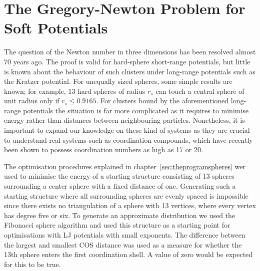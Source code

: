 \section{The Gregory-Newton Problem for Soft Potentials}
\label{sec:thegregorynewtonproblemforsoftpotentials}

The question of the Newton number in three dimensions has been resolved almost
70 years ago\autocite{Schutte_ProblemdreizehnKugeln_1952}. The proof is valid
for hard-sphere short-range potentials, but little is known about the behaviour
of such clusters under long-range potentials such as the Kratzer
potential\autocite{Kratzer_ultrarotenRotationsspektrenHalogenwasserstoffe_1920}.
For unequally sized spheres, some simple results are known; for example, 13 hard
spheres of radius $r_s$ can touch a central sphere of unit radius only if
$r_s\leq 0.9165$.\autocite{phillips12} For clusters bound by the aforementioned
long-range potentials the situation is far more complicated as it requires to
minimise energy rather than distances between neighbouring particles.
Nonetheless, it is important to expand our knowledge on these kind of systems as
they are crucial to understand real systems such as coordination compounds,
which have recently been shown to possess coordination numbers as high as
17\autocite{Kaltsoyannis-2017} or 20.\autocite{Suresh-2016} 

The optimisation procedures explained in chapter~\ref{sec:theprogramspheres} wer
used to minimise the energy of a starting structure consisting of 13 spheres
surrounding a center sphere with a fixed distance of one. Generating such a
starting structure where all surrounding spheres are evenly spaced is impossible
since there exists no triangulation of a sphere with 13 vertices, where every
vertex has degree five or six\autocite{Schwerdtfeger_topologyfullerenes_2015}.
To generate an approximate distribution we used the Fibonacci sphere
algorithm\autocite{Gonzalez_MeasurementAreasSphere_2010,Keinert_SphericalFibonacciMapping_2015}
and used this structure as a starting point for optimisations with \ac{LJ}
potentials with small exponents. The difference between the largest and smallest
\ac{COS} distance was used as a measure for whether the 13th sphere enters the
first coordination shell. A value of zero would be expected for this to be true.

